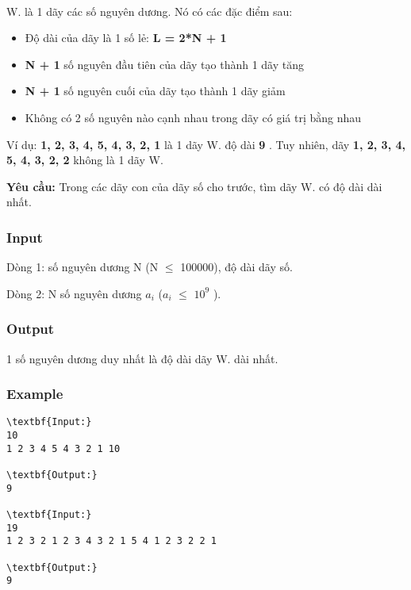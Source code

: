 

 

W. là 1 dãy các số nguyên dương. Nó có các đặc điểm sau:
\begin{itemize}
	\item Độ dài của dãy là 1 số lẻ: \textbf{ L = 2*N + 1 }
	\item \textbf{N + 1 } số nguyên đầu tiên của dãy tạo thành 1 dãy tăng
	\item \textbf{N + 1 } số nguyên cuối của dãy tạo thành 1 dãy giảm
	\item Không có 2 số nguyên nào cạnh nhau trong dãy có giá trị bằng nhau
\end{itemize}

Ví dụ: \textbf{ 1, 2, 3, 4, 5, 4, 3, 2, 1 } là 1 dãy W. độ dài \textbf{ 9 } . Tuy nhiên, dãy \textbf{ 1, 2, 3, 4, 5, 4, 3, 2, 2 } không là 1 dãy W.

\textbf{Yêu cầu: } Trong các dãy con của dãy số cho trước, tìm dãy W. có độ dài dài nhất.

\subsubsection{Input}

Dòng 1: số nguyên dương N (N  $\le$  100000), độ dài dãy số.

Dòng 2: N số nguyên dương $a_{i}$ ($a_{i}$  $\le$  $10^{9}$ ).

\subsubsection{Output}

1 số nguyên dương duy nhất là độ dài dãy W. dài nhất.

\subsubsection{Example}
\begin{verbatim}
\textbf{Input:}
10
1 2 3 4 5 4 3 2 1 10

\textbf{Output:}
9

\textbf{Input:}
19
1 2 3 2 1 2 3 4 3 2 1 5 4 1 2 3 2 2 1

\textbf{Output:}
9\end{verbatim}
